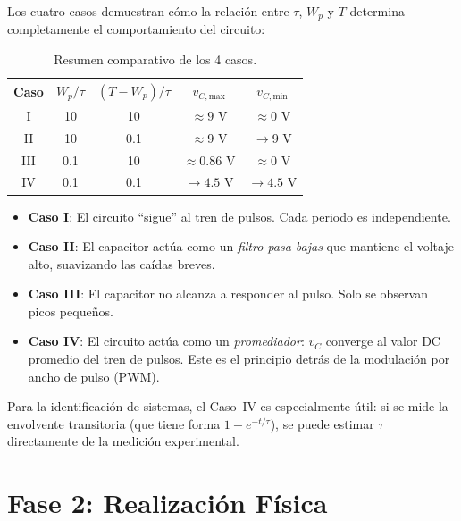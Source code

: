 \documentclass[12pt,a4paper]{article}
\begin{document}
Los cuatro casos demuestran c\'omo la relaci\'on entre $\tau$, $W_p$ y $T$ determina completamente el comportamiento del circuito:

\begin{table}[H]
    \centering
    \caption{Resumen comparativo de los 4 casos.}
    \begin{tabular}{ccccc}
        \toprule
        Caso & $W_p/\tau$ & $(T-W_p)/\tau$ & $v_{C,\text{max}}$ & $v_{C,\text{min}}$ \\
        \midrule
        I   & 10    & 10   & $\approx 9$ V    & $\approx 0$ V \\
        II  & 10    & 0.1  & $\approx 9$ V    & $\to 9$ V \\
        III & 0.1   & 10   & $\approx 0.86$ V & $\approx 0$ V \\
        IV  & 0.1   & 0.1  & $\to 4.5$ V      & $\to 4.5$ V \\
        \bottomrule
    \end{tabular}
\end{table}

\begin{itemize}
    \item \textbf{Caso I}: El circuito ``sigue'' al tren de pulsos. Cada periodo es independiente.
    \item \textbf{Caso II}: El capacitor act\'ua como un \textit{filtro pasa-bajas} que mantiene el voltaje alto, suavizando las ca\'idas breves.
    \item \textbf{Caso III}: El capacitor no alcanza a responder al pulso. Solo se observan picos peque\~nos.
    \item \textbf{Caso IV}: El circuito act\'ua como un \textit{promediador}: $v_C$ converge al valor DC promedio del tren de pulsos. Este es el principio detr\'as de la modulaci\'on por ancho de pulso (PWM).
\end{itemize}

Para la identificaci\'on de sistemas, el Caso~IV es especialmente \'util: si se mide la envolvente transitoria (que tiene forma $1 - e^{-t/\tau}$), se puede estimar $\tau$ directamente de la medici\'on experimental.

\section{Fase 2: Realizaci\'on F\'isica}
\end{document}
